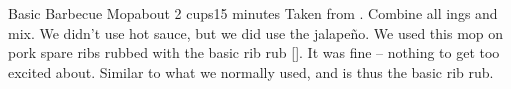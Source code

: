 \newpage
\begin{recipe}{Basic Barbecue Mop}{about 2 cups}{15 minutes}
\freeform Taken from \emph{}.
Combine all ings and mix.
\freeform We didn't use hot sauce, but we did use the jalape\~{n}o.  We used this mop on pork spare ribs rubbed with the basic rib rub \ref{}.  It was fine -- nothing to get too excited about.  Similar to what we normally used, and is thus the basic rib rub.
\end{recipe}

